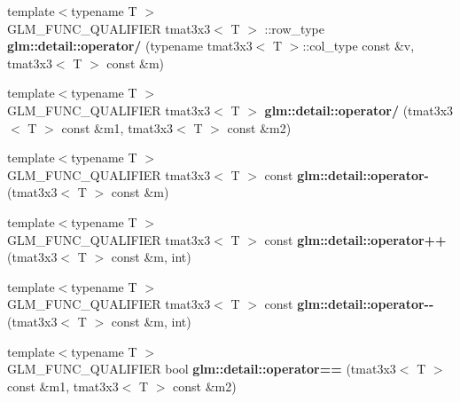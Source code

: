 \begin{DoxyCompactItemize}
\item 
\hypertarget{namespaceglm_1_1detail_a49ba26f5b406e850cadd61cbfb5cbe0b}{{\footnotesize template$<$typename T $>$ }\\\-G\-L\-M\-\_\-\-F\-U\-N\-C\-\_\-\-Q\-U\-A\-L\-I\-F\-I\-E\-R tmat3x3$<$ \-T $>$\*
\-::row\-\_\-type {\bfseries glm\-::detail\-::operator/} (typename tmat3x3$<$ \-T $>$\-::col\-\_\-type const \&v, tmat3x3$<$ \-T $>$ const \&m)}\label{namespaceglm_1_1detail_a49ba26f5b406e850cadd61cbfb5cbe0b}

\item 
\hypertarget{namespaceglm_1_1detail_ac1649184aad412f56831fc1a8b6bc9de}{{\footnotesize template$<$typename T $>$ }\\\-G\-L\-M\-\_\-\-F\-U\-N\-C\-\_\-\-Q\-U\-A\-L\-I\-F\-I\-E\-R tmat3x3$<$ \-T $>$ {\bfseries glm\-::detail\-::operator/} (tmat3x3$<$ \-T $>$ const \&m1, tmat3x3$<$ \-T $>$ const \&m2)}\label{namespaceglm_1_1detail_ac1649184aad412f56831fc1a8b6bc9de}

\item 
\hypertarget{namespaceglm_1_1detail_a0ce44ce808f162f9e97a2f275975b611}{{\footnotesize template$<$typename T $>$ }\\\-G\-L\-M\-\_\-\-F\-U\-N\-C\-\_\-\-Q\-U\-A\-L\-I\-F\-I\-E\-R tmat3x3$<$ \-T $>$\*
 const {\bfseries glm\-::detail\-::operator-\/} (tmat3x3$<$ \-T $>$ const \&m)}\label{namespaceglm_1_1detail_a0ce44ce808f162f9e97a2f275975b611}

\item 
\hypertarget{namespaceglm_1_1detail_a48c8755597f13f46339939814ca19e5b}{{\footnotesize template$<$typename T $>$ }\\\-G\-L\-M\-\_\-\-F\-U\-N\-C\-\_\-\-Q\-U\-A\-L\-I\-F\-I\-E\-R tmat3x3$<$ \-T $>$\*
 const {\bfseries glm\-::detail\-::operator++} (tmat3x3$<$ \-T $>$ const \&m, int)}\label{namespaceglm_1_1detail_a48c8755597f13f46339939814ca19e5b}

\item 
\hypertarget{namespaceglm_1_1detail_ad1cecbeb2bde6f87f6054c17d554e496}{{\footnotesize template$<$typename T $>$ }\\\-G\-L\-M\-\_\-\-F\-U\-N\-C\-\_\-\-Q\-U\-A\-L\-I\-F\-I\-E\-R tmat3x3$<$ \-T $>$\*
 const {\bfseries glm\-::detail\-::operator-\/-\/} (tmat3x3$<$ \-T $>$ const \&m, int)}\label{namespaceglm_1_1detail_ad1cecbeb2bde6f87f6054c17d554e496}

\item 
\hypertarget{namespaceglm_1_1detail_a2690c299d39a5f04d05e4b14f8a4fcfe}{{\footnotesize template$<$typename T $>$ }\\\-G\-L\-M\-\_\-\-F\-U\-N\-C\-\_\-\-Q\-U\-A\-L\-I\-F\-I\-E\-R bool {\bfseries glm\-::detail\-::operator==} (tmat3x3$<$ \-T $>$ const \&m1, tmat3x3$<$ \-T $>$ const \&m2)}\label{namespaceglm_1_1detail_a2690c299d39a5f04d05e4b14f8a4fcfe}


\end{DoxyCompactItemize}
